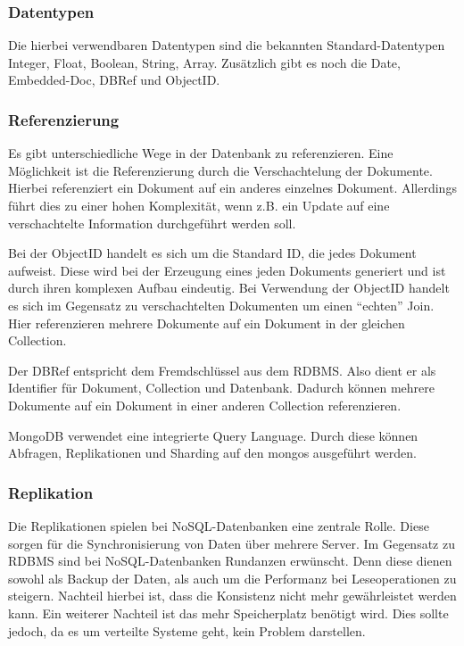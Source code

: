 \subsubsection{Datentypen}
Die hierbei verwendbaren Datentypen sind die bekannten Standard-Datentypen
Integer, Float, Boolean, String, Array. Zusätzlich gibt es noch die Date, Embedded-Doc, DBRef und
ObjectID.

\subsubsection{Referenzierung}
Es gibt unterschiedliche Wege in der Datenbank zu referenzieren.
Eine Möglichkeit ist die Referenzierung durch die Verschachtelung der Dokumente.
Hierbei referenziert ein Dokument auf ein anderes einzelnes Dokument.
Allerdings führt dies zu einer hohen Komplexität, wenn z.B. ein Update auf
eine verschachtelte Information durchgeführt werden soll.

Bei der ObjectID handelt es sich um die Standard ID, die jedes Dokument
aufweist. Diese wird bei der Erzeugung eines jeden Dokuments generiert
und ist durch ihren komplexen Aufbau eindeutig. Bei Verwendung der
ObjectID handelt es sich im Gegensatz zu verschachtelten Dokumenten um
einen ``echten'' Join. Hier referenzieren mehrere Dokumente auf ein Dokument
in der gleichen Collection.

Der DBRef entspricht dem Fremdschlüssel aus dem
RDBMS. Also dient er als Identifier für Dokument, Collection und
Datenbank. Dadurch können mehrere Dokumente auf ein Dokument in einer anderen
Collection referenzieren.

MongoDB verwendet eine integrierte Query Language. Durch
diese können Abfragen, Replikationen und Sharding auf den mongos ausgeführt werden.

\subsubsection{Replikation}
Die Replikationen spielen bei NoSQL-Datenbanken eine zentrale Rolle. Diese sorgen für die Synchronisierung von Daten über mehrere
Server. Im Gegensatz zu RDBMS sind bei NoSQL-Datenbanken Rundanzen erwünscht.
Denn diese dienen sowohl als Backup der Daten, als auch um die Performanz bei
Leseoperationen zu steigern. Nachteil hierbei ist, dass die Konsistenz nicht mehr gewährleistet werden kann.
Ein weiterer Nachteil ist das mehr Speicherplatz benötigt wird. Dies sollte jedoch, da es um
verteilte Systeme geht, kein Problem darstellen.

